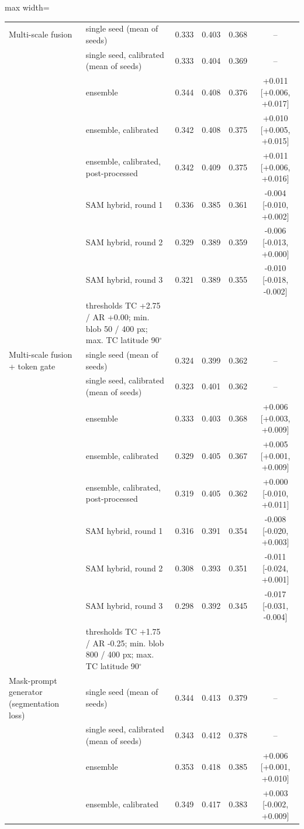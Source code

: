 \begin{table}[htbp]
\begin{adjustbox}{max width=\linewidth}
\begin{tabular}{llcccc}
\midrule
Multi-scale fusion & single seed (mean of seeds) & 0.333 & 0.403 & 0.368 & -- \\
 & single seed, calibrated (mean of seeds) & 0.333 & 0.404 & 0.369 & -- \\
 & ensemble & 0.344 & 0.408 & 0.376 & +0.011 [+0.006, +0.017] \\
 & ensemble, calibrated & 0.342 & 0.408 & 0.375 & +0.010 [+0.005, +0.015] \\
 & ensemble, calibrated, post-processed & 0.342 & 0.409 & 0.375 & +0.011 [+0.006, +0.016] \\
 & SAM hybrid, round 1 & 0.336 & 0.385 & 0.361 & -0.004 [-0.010, +0.002] \\
 & SAM hybrid, round 2 & 0.329 & 0.389 & 0.359 & -0.006 [-0.013, +0.000] \\
 & SAM hybrid, round 3 & 0.321 & 0.389 & 0.355 & -0.010 [-0.018, -0.002] \\
 & \footnotesize thresholds TC +2.75 / AR +0.00; min. blob 50 / 400 px; max. TC latitude 90$^\circ$ &  &  &  &  \\
\midrule
Multi-scale fusion + token gate & single seed (mean of seeds) & 0.324 & 0.399 & 0.362 & -- \\
 & single seed, calibrated (mean of seeds) & 0.323 & 0.401 & 0.362 & -- \\
 & ensemble & 0.333 & 0.403 & 0.368 & +0.006 [+0.003, +0.009] \\
 & ensemble, calibrated & 0.329 & 0.405 & 0.367 & +0.005 [+0.001, +0.009] \\
 & ensemble, calibrated, post-processed & 0.319 & 0.405 & 0.362 & +0.000 [-0.010, +0.011] \\
 & SAM hybrid, round 1 & 0.316 & 0.391 & 0.354 & -0.008 [-0.020, +0.003] \\
 & SAM hybrid, round 2 & 0.308 & 0.393 & 0.351 & -0.011 [-0.024, +0.001] \\
 & SAM hybrid, round 3 & 0.298 & 0.392 & 0.345 & -0.017 [-0.031, -0.004] \\
 & \footnotesize thresholds TC +1.75 / AR -0.25; min. blob 800 / 400 px; max. TC latitude 90$^\circ$ &  &  &  &  \\
\midrule
Mask-prompt generator (segmentation loss) & single seed (mean of seeds) & 0.344 & 0.413 & 0.379 & -- \\
 & single seed, calibrated (mean of seeds) & 0.343 & 0.412 & 0.378 & -- \\
 & ensemble & 0.353 & 0.418 & 0.385 & +0.006 [+0.001, +0.010] \\
 & ensemble, calibrated & 0.349 & 0.417 & 0.383 & +0.003 [-0.002, +0.009] \\

\end{tabular}
\end{adjustbox}
\end{table}
